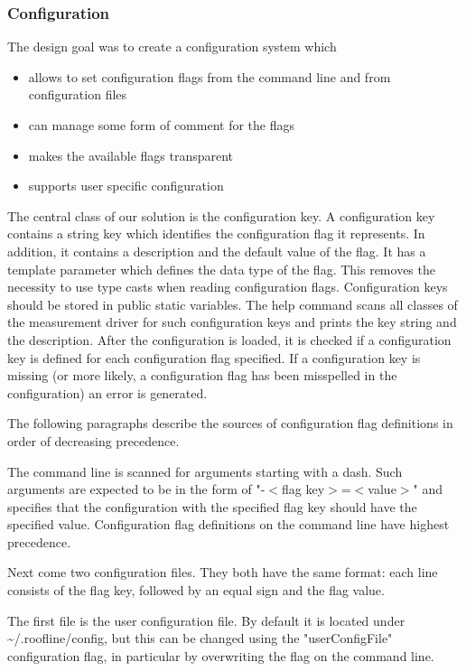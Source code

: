\documentclass[a4paper,12pt]{article}
\newcommand{\file}[1]{}
\begin{document}
\subsubsection{Configuration}
The design goal was to create a configuration system which
\begin{itemize}
\item allows to set configuration flags from the command line and from configuration files
\item can manage some form of comment for the flags
\item makes the available flags transparent
\item supports user specific configuration
\end{itemize}

\file{measurementDriver/src/ch/ethz/ruediste/roofline/measurementDriver/ConfigurationKey.java}
The central class of our solution is the configuration key. A configuration key contains a string key which identifies the configuration flag it represents. In addition, it contains a description and the default value of the flag. It has a template parameter which defines the data type of the flag. This removes the necessity to use type casts when reading configuration flags. Configuration keys should be stored in public static variables. The help command scans all classes of the measurement driver for such configuration keys and prints the key string and the description. After the configuration is loaded, it is checked if a configuration key is defined for each configuration flag specified. If a configuration key is missing (or more likely, a configuration flag has been misspelled in the configuration) an error is generated.

The following paragraphs describe the sources of configuration flag definitions in order of decreasing precedence. 

The command line is scanned for arguments starting with a dash. Such arguments are expected to be in the form of "-$<$flag key$>$=$<$value$>$" and specifies that the configuration with the specified flag key should have the specified value. Configuration flag definitions on the command line have highest precedence.

Next come two configuration files. They both have the same format: each line consists of the flag key, followed by an equal sign and the flag value. 

The first file is the user configuration file. By default it is located under \textasciitilde/.roofline/config, but this can be changed using the "userConfigFile" configuration flag, in particular by overwriting the flag on the command line.
\end{document}
